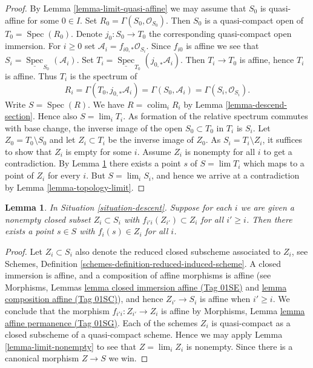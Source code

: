\documentclass{amsart}
\theoremstyle{plain}
\newtheorem{lemma}[subsection]{Lemma}
\theoremstyle{definition}
\theoremstyle{remark}
\numberwithin{equation}{subsection}
\def\lim{\mathop{\mathrm{lim}}\nolimits}
\def\colim{\mathop{\mathrm{colim}}\nolimits}
\def\Spec{\mathop{\mathrm{Spec}}}
\begin{document}
\begin{proof}
By Lemma \ref{lemma-limit-quasi-affine} we may assume that $S_0$ is
quasi-affine for some $0 \in I$. Set $R_0 = \Gamma(S_0, \mathcal{O}_{S_0})$.
Then $S_0$ is a quasi-compact open of $T_0 = \Spec(R_0)$. Denote
$j_0 : S_0 \to T_0$ the corresponding quasi-compact open immersion.
For $i \geq 0$ set $\mathcal{A}_i = f_{i0, *}\mathcal{O}_{S_i}$.
Since $f_{i0}$ is affine we see that
$S_i = \underline{\Spec}_{S_0}(\mathcal{A}_i)$.
Set $T_i = \underline{\Spec}_{T_0}(j_{0, *}\mathcal{A}_i)$.
Then $T_i \to T_0$ is affine, hence $T_i$ is affine. Thus
$T_i$ is the spectrum of
$$
R_i = \Gamma(T_0, j_{0, *}\mathcal{A}_i) = \Gamma(S_0, \mathcal{A}_i) =
\Gamma(S_i, \mathcal{O}_{S_i}).
$$
Write $S = \Spec(R)$. We have $R = \colim_i R_i$
by Lemma \ref{lemma-descend-section}.
Hence also $S = \lim_i T_i$. As formation of the relative spectrum commutes
with base change, the inverse image
of the open $S_0 \subset T_0$ in $T_i$ is $S_i$.
Let $Z_0 = T_0 \setminus S_0$ and let $Z_i \subset T_i$
be the inverse image of $Z_0$. As $S_i = T_i \setminus Z_i$, it suffices
to show that $Z_i$ is empty for some $i$. Assume $Z_i$ is nonempty for all
$i$ to get a contradiction. By Lemma \ref{lemma-limit-closed-nonempty}
there exists a point $s$ of $S = \lim T_i$ which maps to a point of $Z_i$
for every $i$. But $S = \lim_i S_i$, and hence we arrive at a contradiction
by Lemma \ref{lemma-topology-limit}.
\end{proof}


\begin{lemma}
\label{lemma-limit-closed-nonempty}
In Situation \ref{situation-descent}.
Suppose for each $i$ we are given a nonempty closed subset
$Z_i \subset S_i$ with $f_{i'i}(Z_{i'}) \subset Z_i$ for all
$i' \geq i$.
Then there exists a point $s \in S$ with $f_i(s) \in Z_i$ for
all $i$.
\end{lemma}

\begin{proof}
Let $Z_i \subset S_i$ also denote the reduced closed subscheme
associated to $Z_i$, see Schemes,
Definition \ref{schemes-definition-reduced-induced-scheme}.
A closed immersion is affine, and a composition of affine
morphisms is affine (see
Morphisms, Lemmas \href{https://stacks.math.columbia.edu/tag/01SE}{lemma closed immersion affine (Tag 01SE)}
and \href{https://stacks.math.columbia.edu/tag/01SC}{lemma composition affine (Tag 01SC)}), and hence $Z_{i'} \to S_i$ is
affine when $i' \geq i$. We conclude that the morphism
$f_{i'i} : Z_{i'} \to Z_i$ is affine by
Morphisms, Lemma \href{https://stacks.math.columbia.edu/tag/01SG}{lemma affine permanence (Tag 01SG)}.
Each of the schemes $Z_i$ is quasi-compact as a closed
subscheme of a quasi-compact scheme. Hence we may apply
Lemma \ref{lemma-limit-nonempty} to see that
$Z = \lim_i Z_i$ is nonempty. Since there is a
canonical morphism $Z \to S$ we win.
\end{proof}
\end{document}
